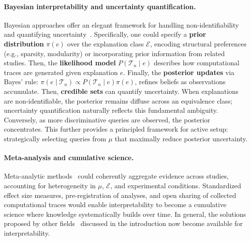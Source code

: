 \paragraph{Bayesian interpretability and uncertainty quantification.}
Bayesian approaches offer an elegant framework for handling non-identifiability and quantifying uncertainty~\citep{gelman2013bayesian}. Specifically, one could specify a \textbf{prior distribution} $\pi(e)$ over the explanation class $\mathcal{E}$, encoding structural preferences (e.g., sparsity, modularity) or incorporating prior information from related studies. Then, the \textbf{likelihood model} $P(\mathcal{T}_n \mid e)$ describes how computational traces are generated given explanation $e$. Finally, the \textbf{posterior updates} via Bayes' rule: $\pi(e \mid \mathcal{T}_n) \propto P(\mathcal{T}_n \mid e) \pi(e)$, refines beliefs as observations accumulate. Then, \textbf{credible sets} can quantify uncertainty.
% 
When explanations are non-identifiable, the posterior remains diffuse across an equivalence class; uncertainty quantification naturally reflects this fundamental ambiguity. Conversely, as more discriminative queries are observed, the posterior concentrates. This further provides a principled framework for active setup: strategically selecting queries from $\mu$ that maximally reduce posterior uncertainty.

\paragraph{Meta-analysis and cumulative science.}
Meta-analytic methods~\citep{borenstein2021introduction} could coherently aggregate evidence across studies, accounting for heterogeneity in $\mu$, $\mathcal{E}$, and experimental conditions. Standardized effect size measures, pre-registration of analyses, and open sharing of collected computational traces would enable interpretability to become a cumulative science where knowledge systematically builds over time. In general, the solutions proposed by other fields~\citep{poldrack2017scanning,korbmacher2023replication} discussed in the introduction now become available for interpretability.







